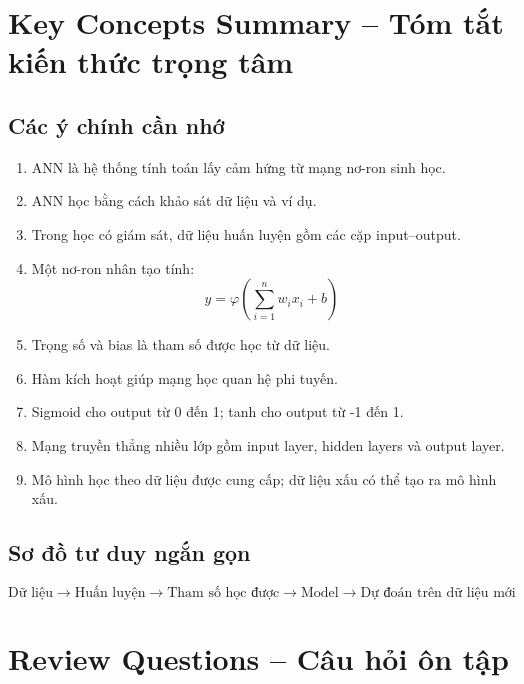 \section{Key Concepts Summary -- Tóm tắt kiến thức trọng tâm}

\subsection{Các ý chính cần nhớ}

\begin{enumerate}
    \item ANN là hệ thống tính toán lấy cảm hứng từ mạng nơ-ron sinh học.
    \item ANN học bằng cách khảo sát dữ liệu và ví dụ.
    \item Trong học có giám sát, dữ liệu huấn luyện gồm các cặp input--output.
    \item Một nơ-ron nhân tạo tính:
    \[
        y = \varphi\left(\sum_{i=1}^{n}w_ix_i+b\right)
    \]
    \item Trọng số và bias là tham số được học từ dữ liệu.
    \item Hàm kích hoạt giúp mạng học quan hệ phi tuyến.
    \item Sigmoid cho output từ 0 đến 1; tanh cho output từ -1 đến 1.
    \item Mạng truyền thẳng nhiều lớp gồm input layer, hidden layers và output layer.
    \item Mô hình học theo dữ liệu được cung cấp; dữ liệu xấu có thể tạo ra mô hình xấu.
\end{enumerate}

\subsection{Sơ đồ tư duy ngắn gọn}

\[
\boxed{
\text{Dữ liệu}
\rightarrow
\text{Huấn luyện}
\rightarrow
\text{Tham số học được}
\rightarrow
\text{Model}
\rightarrow
\text{Dự đoán trên dữ liệu mới}
}
\]

\section{Review Questions -- Câu hỏi ôn tập}

